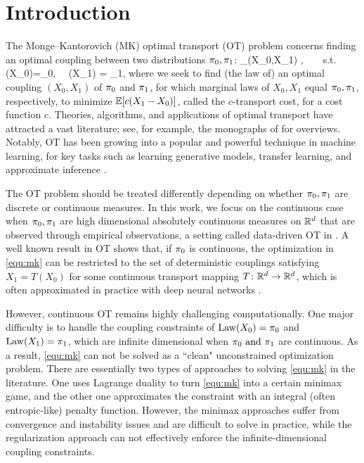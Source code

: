 

\section{Introduction} 

The Monge–Kantorovich (MK) optimal transport (OT) problem  concerns finding an optimal coupling between two distributions ${\pi}_0,{\pi}_1$: %
\bbb \label{equ:mk}
\inf_{(X_0,X_1)} %
\E[c(X_1 - X_0)],~~~~s.t.~~~~  \law(X_0)=\tg_0,~~ \law(X_1) = \tg_1, 
\eee 
where 
we seek to 
find (the law of) an optimal coupling $(X_0,X_1)$ of ${\pi}_0$ and ${\pi}_1$, for which  marginal laws of $X_0,X_1$ equal  ${\pi}_0,{\pi}_1$, respectively, to minimize $\mathbb{E}[c(X_1-X_0)]$, called the $c$-transport cost, 
for 
 a cost function $c$. 
Theories, algorithms, and applications of  optimal transport have attracted a vast literature; see, for example,  the monographs of \cite{villani2021topics,  villani2009optimal, ambrosio2021lectures, santambrogio2015optimal, peyre2019computational} for overviews. %
Notably, OT has been  growing into a popular and powerful technique in machine learning, 
for key tasks such as learning generative models, transfer learning, and approximate inference \citep[e.g.,][]{peyre2019computational, arjovsky2017wasserstein, solomon2014wasserstein, el2012bayesian, courty2014domain, marzouk2016introduction}. 

The OT problem should be treated differently depending on whether ${\pi}_0,{\pi}_1$ are discrete or continuous measures. In this work, we focus on the continuous case when ${\pi}_0,{\pi}_1$ are high dimensional absolutely continuous measures on $\mathbb{R}^d$ that are observed through empirical observations, a setting called data-driven OT in \cite{trigila2016data}. 
A well known result in OT \citep[e.g.,][]{villani2009optimal} shows that,  
 if ${\pi}_0$ is continuous, the optimization in \eqref{equ:mk} can be restricted to the set of deterministic couplings satisfying $X_1 = T(X_0)$ for some continuous transport mapping $T\colon \mathbb{R}^d\to\mathbb{R}^d$, 
which is often 
approximated in practice with deep  neural networks %
\citep[e.g.,][]{makkuva2020optimal, korotin2021neural, korotin2022neural, huang2020convex}. 


However, continuous OT remains highly challenging computationally. 
One major difficulty  
is to handle the coupling constraints of $\mathrm{Law}(X_0) = {\pi}_0$ and $\mathrm{Law}(X_1)={\pi}_1$,
which are infinite dimensional when $\text{${\pi}_0$ and ${\pi}_1$}$  are continuous. 
As a result, 
\eqref{equ:mk} can not be solved as a ``clean" unconstrained optimization problem. 
There are essentially two types of approaches to solving \eqref{equ:mk} in the literature.  
One uses Lagrange duality to turn \eqref{equ:mk} into a certain minimax game, and the other one approximates 
the constraint with an integral (often entropic-like) penalty function.
However, the minimax approaches suffer from convergence and instability issues and 
are difficult to solve in practice, 
while the regularization approach can not effectively enforce the infinite-dimensional coupling constraints.

